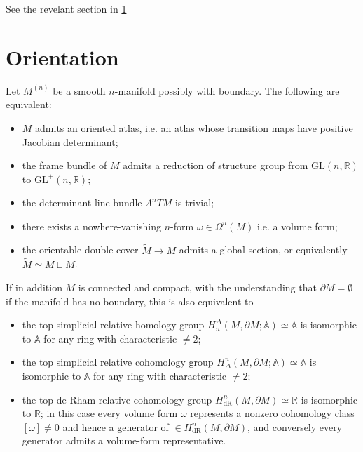 \documentclass[../geometry_main.tex]{subfiles}
\begin{document}
See the revelant section in \ref{}




\section{Orientation}

\begin{mytheorem}
Let $M^{(n)}$ be a smooth $n$-manifold possibly with boundary. The following are equivalent:
\begin{itemize}
    \item $M$ admits an oriented atlas, i.e. an atlas whose transition
          maps have positive Jacobian determinant;
    \item the frame bundle of $M$ admits a reduction of structure group
          from $\mathrm{GL}(n,\mathbb R)$ to $\mathrm{GL}^{+}(n,\mathbb R)$;
    \item the determinant line bundle $\Lambda^n TM$ is trivial;
    \item there exists a nowhere-vanishing $n$-form $\omega\in\Omega^n(M)$ i.e. a volume form;
    \item the orientable double cover $\widetilde M\to M$ admits a global section, or equivalently $\widetilde{M}\simeq M\sqcup M$.
\end{itemize}

If in addition $M$ is connected and compact, with the understanding that $\partial M=\emptyset$ if the manifold has no boundary, this is also equivalent to
\begin{itemize}
    \item the top simplicial relative homology group $H^\Delta_n(M, \partial M;\mathbb A)\simeq \mathbb A$ is isomorphic to $\mathbb A$ for any ring with characteristic $\neq 2$;
    \item the top simplicial relative cohomology group $H_\Delta^n(M, \partial M;\mathbb A)\simeq \mathbb A$ is isomorphic to $\mathbb A$ for any ring with characteristic $\neq 2$;
    \item the top de Rham relative cohomology group $H^n_{\mathrm{dR}}(M,\partial M)\simeq \mathbb R$ is isomorphic to $\mathbb R$; in this case every volume form $\omega$ represents a nonzero cohomology class $[\omega]\neq 0$ and hence a generator of $\in H^n_{\mathrm{dR}}(M,\partial M)$, and conversely every generator admits a volume-form representative.
\end{itemize}
\end{mytheorem}
\end{document}
